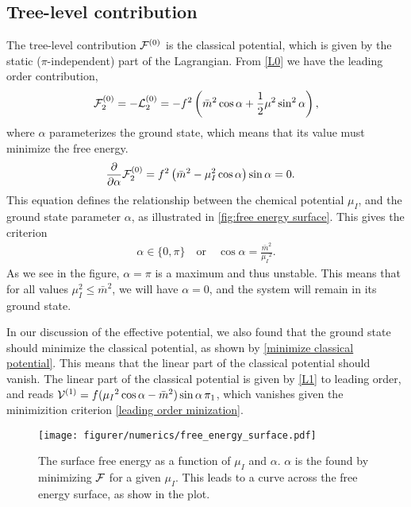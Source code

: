 \subsection*{Tree-level contribution}
The tree-level contribution $\mathcal{F}^{(0)}$ is the classical potential, which is given by the static ($\pi$-independent) part of the Lagrangian.
From \cref{L0} we have the leading order contribution,
\begin{equation}
    \label{leading order contribution free energy}
    \mathcal{F}_2^{(0)}
    = - \mathcal{L}_2^{(0)} 
    = 
    -f^2   
    \left(
        \bar m^2 \cos{\alpha}
        + \frac{1}{2} \mu^2 \sin^2{\alpha}
    \right),
\end{equation}
where $\alpha$ parameterizes the ground state, which means that its value must minimize the free energy.
\begin{align}
    &\diffp{}{\alpha} \Ef_2^{(0)} 
    = f^2\left(\bar m^2 - \mu_I^2\cos{\alpha}\right)\sin{\alpha}
    = 0.
\end{align}
This equation defines the relationship between the chemical potential $\mu_I$, and the ground state parameter $\alpha$, as illustrated in \autoref{fig:free energy surface}.
This gives the criterion
\begin{align}
    \label{leading order minization}
    \alpha \in \{0, \pi\} \quad
    \mathrm{or} \quad
    \cos{\alpha} = \frac{\bar m^2}{\mu_I{}^2}.
\end{align}
As we see in the figure, $\alpha = \pi$ is a maximum and thus unstable.
This means that for all values $\mu_I^2 \leq \bar m^2$, we will have $\alpha = 0$, and the system will remain in its ground state.

In our discussion of the effective potential, we also found that the ground state should minimize the classical potential, as shown by \cref{minimize classical potential}.
This means that the linear part of the classical potential should vanish.
The linear part of the classical potential is given by \cref{L1} to leading order, and reads $\mathcal{V}^{(1)} = f(\mu_I{}^2\cos{\alpha} - \bar m^2)\sin{\alpha} \, \pi_1 $, which vanishes given the minimizition criterion \cref{leading order minization}.
\begin{figure}[ht]
    \centering
    \texttt{[image: figurer/numerics/free\_energy\_surface.pdf]}
    \caption{The surface free energy as a function of $\mu_I$ and $\alpha$. $\alpha$ is the found by minimizing $\mathcal{F}$ for a given $\mu_I$. This leads to a curve across the free energy surface, as show in the plot.}
    \label{fig:free energy surface}
\end{figure}

